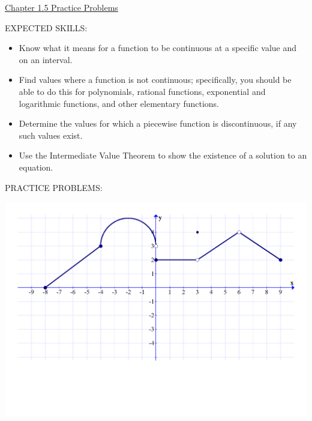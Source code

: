 \documentclass[12pt]{article}
\begin{document}
\begin{center}
\underline{\LARGE{Chapter 1.5 Practice Problems}}
\end{center}

\noindent EXPECTED SKILLS:

\begin{itemize}

\item Know what it means for a function to be continuous at a specific value and on an interval.

\item Find values where a function is not continuous; specifically, you should be able to do this for polynomials, rational functions, exponential and logarithmic functions, and other elementary functions.

\item Determine the values for which a piecewise function is discontinuous, if any such values exist.

\item Use the Intermediate Value Theorem to show the existence of a solution to an equation.

\end{itemize}

\noindent PRACTICE PROBLEMS:


\begin{center}
\includegraphics[scale=0.5]{graph.pdf}
\end{center}
\end{document}
